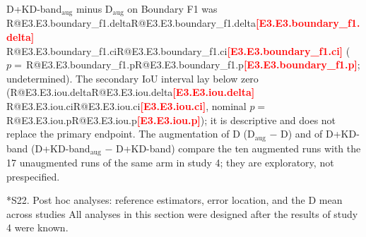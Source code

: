 \documentclass[10pt]{article}
\makeatletter
\newcommand{\R}[1]{\ifcsname R@#1\endcsname\csname R@#1\endcsname\else\textbf{\textcolor{red}{[#1]}}\fi}
\renewcommand\section{\@startsection{section}{1}{\z@}{-2.4ex \@plus -1ex \@minus -.2ex}{1.2ex \@plus .2ex}{\normalfont\large\bfseries}}
\renewcommand\paragraph{\@startsection{paragraph}{4}{\z@}{1.6ex \@plus .5ex \@minus .2ex}{-1em}{\normalfont\normalsize\bfseries}}
\newcommand{\fitwidth}[1]{\sbox{\fitbox}{#1}\ifdim\wd\fitbox>\linewidth\resizebox{\linewidth}{!}{\usebox{\fitbox}}\else\usebox{\fitbox}\fi}
\makeatother
\begin{document}
\paragraph{Results.} D+KD-band$_{\mathrm{aug}}$ minus D$_{\mathrm{aug}}$ on Boundary F1 was \R{E3.E3.boundary_f1.delta} \R{E3.E3.boundary_f1.ci} ($p=$\,\R{E3.E3.boundary_f1.p}; undetermined). The secondary IoU interval lay below zero (\R{E3.E3.iou.delta} \R{E3.E3.iou.ci}, nominal $p=$\,\R{E3.E3.iou.p}); it is descriptive and does not replace the primary endpoint. The augmentation of D (D$_{\mathrm{aug}}$ $-$ D) and of D+KD-band (D+KD-band$_{\mathrm{aug}}$ $-$ D+KD-band) compare the ten augmented runs with the 17 unaugmented runs of the same arm in study 4; they are exploratory, not prespecified.

\begin{table}[!htbp]\centering\scriptsize
\fitwidth{}
\caption{\label{tab:s-e3-all}Augmentation control, all metrics, official ACDC patients 101--150 (exploratory). Distillation under augmentation: prespecified primary contrast (Boundary F1) and descriptive secondary metrics; augmentation of D and of D+KD-band: augmented versus unaugmented runs of one arm, exploratory, not prespecified; readings against $\pm$2\,px (HD95) and $\pm$0.5\,px (ASSD) for the distances. Positive $\Delta$ favours the first arm; HD95 and ASSD in pixels with sign reversed. Unadjusted $p$. Arm means are means of run means (between-run SD).}
\end{table}

\begin{table}[!htbp]\centering\small

\caption{\label{tab:s-e3-seed}Augmentation control: run means per seed (patient-level means over the 50 official patients).}
\end{table}

\begin{table}[!htbp]\centering\small
\fitwidth{}
\caption{\label{tab:s-e3-class}Augmentation control per structure, D+KD-band$_{\mathrm{aug}}$ $-$ D$_{\mathrm{aug}}$ (descriptive, unadjusted).}
\end{table}


\FloatBarrier
\section*{S22. Post hoc analyses: reference estimators, error location, and the D mean across studies}
All analyses in this section were designed after the results of study 4 were known.
\end{document}
